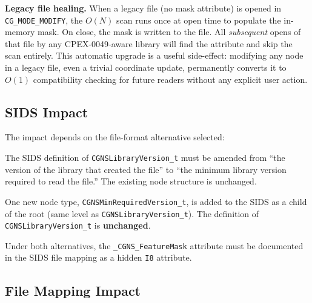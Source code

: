 \documentclass[11pt,letterpaper]{article}
\begin{document}
\textbf{Legacy file healing.}  When a legacy file (no mask attribute)
is opened in \texttt{CG\_MODE\_MODIFY}, the $O(N)$ scan runs once at
open time to populate the in-memory mask.  On close, the mask is
written to the file.  All \emph{subsequent} opens of that file by
any CPEX-0049-aware library will find the attribute and skip the scan
entirely.  This automatic upgrade is a useful side-effect: modifying
any node in a legacy file, even a trivial coordinate update,
permanently converts it to $O(1)$ compatibility checking for future
readers without any explicit user action.

\subsection{SIDS Impact}

The impact depends on the file-format alternative selected:

\begin{description}[leftmargin=2em]
\item[Alternative A.]  The SIDS definition of
  \texttt{CGNSLibraryVersion\_t} must be amended from ``the version
  of the library that created the file'' to ``the minimum library
  version required to read the file.''  The existing node structure
  is unchanged.

\item[Alternative B (recommended).]  One new node type,
  \texttt{CGNSMinRequiredVersion\_t}, is added to the SIDS as a
  child of the root (same level as
  \texttt{CGNSLibraryVersion\_t}).  The definition of
  \texttt{CGNSLibraryVersion\_t} is \textbf{unchanged}.

  \medskip
  \noindent{}
  \medskip
\end{description}

Under both alternatives, the \texttt{\_CGNS\_FeatureMask} attribute
must be documented in the SIDS file mapping as a hidden \texttt{I8}
attribute.

\subsection{File Mapping Impact}
\label{sec:file-mapping}
\end{document}
